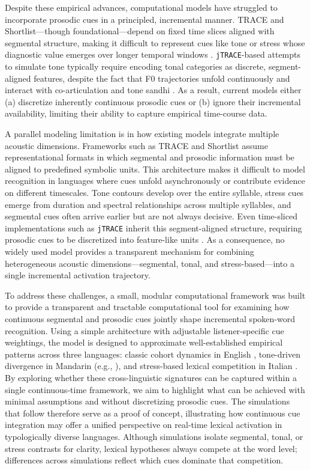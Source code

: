 Despite these empirical advances, computational models have struggled to incorporate prosodic cues in a principled, incremental manner. TRACE and Shortlist---though foundational---depend on fixed time slices aligned with segmental structure, making it difficult to represent cues like tone or stress whose diagnostic value emerges over longer temporal windows \cite{McClellandElman1986,Norris1994,NorrisMcQueen2008,Francis_2008}. \texttt{jTRACE}-based attempts to simulate tone typically require encoding tonal categories as discrete, segment-aligned features, despite the fact that F0 trajectories unfold continuously and interact with co-articulation and tone sandhi \cite{Strauss2007,ShuaiMalins2017, bramlett22_speechprosody}. As a result, current models either (a) discretize inherently continuous prosodic cues or (b) ignore their incremental availability, limiting their ability to capture empirical time-course data.

A parallel modeling limitation is in how existing models integrate multiple acoustic dimensions. Frameworks such as TRACE and Shortlist assume representational formats in which segmental and prosodic information must be aligned to predefined symbolic units. This architecture makes it difficult to model recognition in languages where cues unfold asynchronously or contribute evidence on different timescales. Tone contours develop over the entire syllable, stress cues emerge from duration and spectral relationships across multiple syllables, and segmental cues often arrive earlier but are not always decisive. Even time-sliced implementations such as \texttt{jTRACE} inherit this segment-aligned structure, requiring prosodic cues to be discretized into feature-like units \cite{Strauss2007}. As a consequence, no widely used model provides a transparent mechanism for combining heterogeneous acoustic dimensions---segmental, tonal, and stress-based---into a single incremental activation trajectory.

To address these challenges, a small, modular computational framework was built to provide a transparent and tractable computational tool for examining how continuous segmental and prosodic cues jointly shape incremental spoken-word recognition. Using a simple architecture with adjustable listener-specific cue weightings, the model is designed to approximate well-established empirical patterns across three languages: classic cohort dynamics in English \cite{Allopenna1998}, tone-driven divergence in Mandarin (e.g., \cite{MalinsJoanisse2010,ShenFroud2019}), and stress-based lexical competition in Italian \cite{SulpizioMcQueen2012,BramlettWiener2025}. By exploring whether these cross-linguistic signatures can be captured within a single continuous-time framework, we aim to highlight what can be achieved with minimal assumptions and without discretizing prosodic cues. The simulations that follow therefore serve as a proof of concept, illustrating how continuous cue integration may offer a unified perspective on real-time lexical activation in typologically diverse languages. Although simulations isolate segmental, tonal, or stress contrasts for clarity, lexical hypotheses always compete at the word level; differences across simulations reflect which cues dominate that competition.

